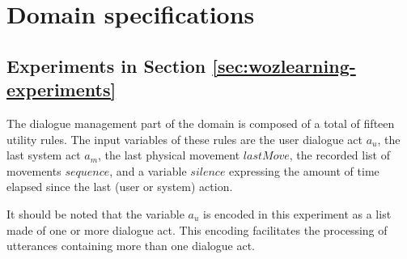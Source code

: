 
\chapter{Domain specifications}
\label{chap:domainspecs}

\section{Experiments in Section \ref{sec:wozlearning-experiments}}

The dialogue management part of the domain is composed of a total of fifteen utility rules.  The input variables of these rules are the user dialogue act $a_u$, the last system act $a_m$, the last physical movement $\mathit{lastMove}$, the recorded list of movements $\mathit{sequence}$, and a variable $\mathit{silence}$ expressing the amount of time elapsed since the last (user or system) action.  

It should be noted that the variable $a_u$ is encoded in this experiment as a list made of one or more dialogue act.  This encoding facilitates the processing of utterances containing more than one dialogue act.  

